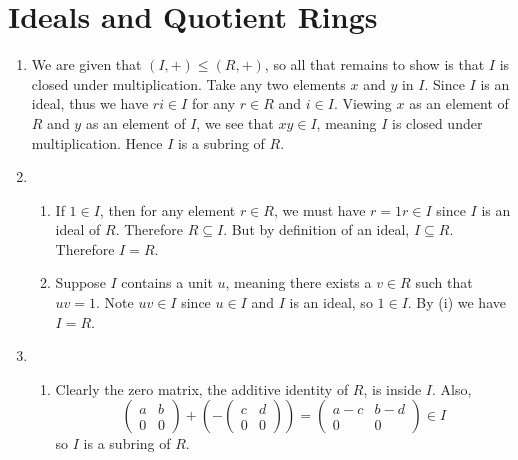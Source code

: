\section{Ideals and Quotient Rings}
\begin{enumerate}
    \item We are given that $(I, +) \leq (R,+)$, so all that remains to show is that $I$ is closed under multiplication. Take any two elements $x$ and $y$ in $I$. Since $I$ is an ideal, thus we have $ri \in I$ for any $r \in R$ and $i \in I$. Viewing $x$ as an element of $R$ and $y$ as an element of $I$, we see that $xy \in I$, meaning $I$ is closed under multiplication. Hence $I$ is a subring of $R$.
    
    \item \begin{enumerate}[label=(\roman*)]
        \item If $1 \in I$, then for any element $r \in R$, we must have $r = 1r \in I$ since $I$ is an ideal of $R$. Therefore $R \subseteq I$. But by definition of an ideal, $I \subseteq R$. Therefore $I = R$.
        \item Suppose $I$ contains a unit $u$, meaning there exists a $v \in R$ such that $uv = 1$. Note $uv \in I$ since $u \in I$ and $I$ is an ideal, so $1 \in I$. By (i) we have $I = R$.
    \end{enumerate}
    
    \item \begin{enumerate}[label=(\roman*)]
        \item Clearly the zero matrix, the additive identity of $R$, is inside $I$. Also,
        \[
            \begin{pmatrix}a&b\\0&0\end{pmatrix} + (-\begin{pmatrix}c&d\\0&0\end{pmatrix}) = \begin{pmatrix}a-c&b-d\\0&0\end{pmatrix} \in I
        \]
        so $I$ is a subring of $R$.


\end{enumerate}
\end{enumerate}
